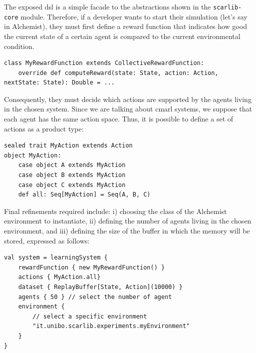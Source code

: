 The exposed \ac{dsl} is a simple facade 
 to the abstractions shown in the \texttt{scarlib-core} module. 
Therefore, if a developer wants to start their simulation 
 (let's say in Alchemist), 
 they must first define a reward function that indicates 
 how good the current state of a certain agent 
 is compared to the current environmental condition.
\begin{lstlisting}
class MyRewardFunction extends CollectiveRewardFunction:
    override def computeReward(state: State, action: Action, nextState: State): Double = ...
\end{lstlisting}
Consequently, they must decide which actions are supported 
 by the agents living in the chosen system. 
%
Since we are talking about \ac{cmarl} systems, 
 we suppose that each agent has the same action space. 
 Thus, it is possible to define a set of actions as a product type:
\begin{lstlisting}
sealed trait MyAction extends Action
object MyAction:
    case object A extends MyAction
    case object B extends MyAction
    case object C extends MyAction
    def all: Seq[MyAction] = Seq(A, B, C)
\end{lstlisting}
Final refinements required include: 
i) choosing the class of the Alchemist environment to instantiate, 
ii) defining the number of agents living in the chosen environment, and 
iii) defining the size of the buffer in which the memory will be stored,
expressed as follows:
\begin{lstlisting}
val system = learningSystem {
    rewardFunction { new MyRewardFunction() }
    actions { MyAction.all}
    dataset { ReplayBuffer[State, Action](10000) }
    agents { 50 } // select the number of agent
    environment {
        // select a specific environment
        "it.unibo.scarlib.experiments.myEnvironment"
    }
}
\end{lstlisting}

